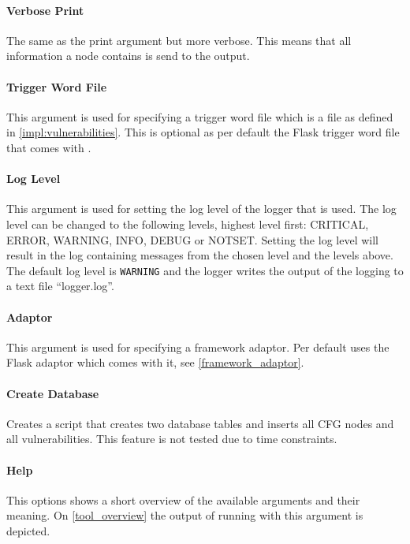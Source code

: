 \paragraph{Verbose Print}
The same as the print argument but more verbose.
This means that all information a node contains is send to the output.

\paragraph{Trigger Word File}
This argument is used for specifying a trigger word file which is a file as defined in \cref{impl:vulnerabilities}.
This is optional as per default the Flask trigger word file that comes with \pyt{}.

\paragraph{Log Level}
This argument is used for setting the log level of the logger that is used.
The log level can be changed to the following levels, highest level first: CRITICAL, ERROR, WARNING, INFO, DEBUG or NOTSET.
Setting the log level will result in the log containing messages from the chosen level and the levels above.
The default log level is \texttt{WARNING} and the logger writes the output of the logging to a text file ``logger.log''.

\paragraph{Adaptor}
This argument is used for specifying a framework adaptor.
Per default \pyt{} uses the Flask adaptor which comes with it, see \cref{framework_adaptor}.

\paragraph{Create Database}
Creates a script that creates two database tables and inserts all CFG nodes and all vulnerabilities.
This feature is not tested due to time constraints.

\paragraph{Help}
This options shows a short overview of the available arguments and their meaning.
On \cref{tool_overview} the output of running \pyt{} with this argument is depicted.

